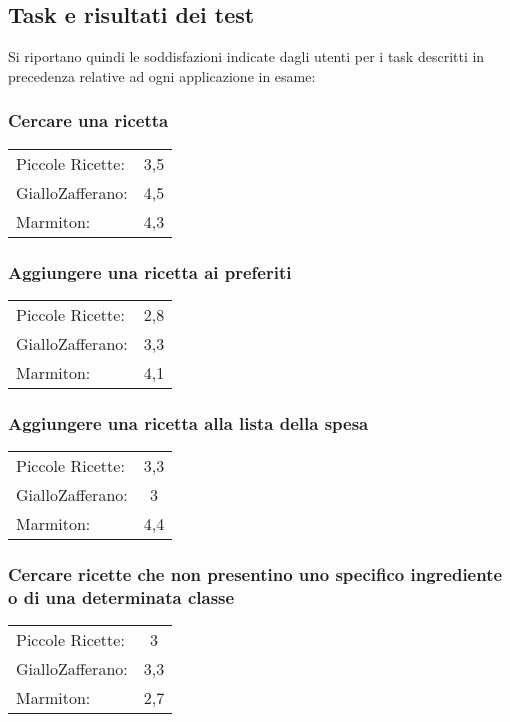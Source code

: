 \subsection{Task e risultati dei test}
Si riportano quindi le soddisfazioni indicate dagli utenti
per i task descritti in precedenza relative ad ogni applicazione in esame:

\subsubsection{Cercare una ricetta}
\begin{tabular}{l c}
Piccole Ricette: & 3,5\\
GialloZafferano: & 4,5\\
Marmiton: & 4,3\\
\end{tabular}

\subsubsection{Aggiungere una ricetta ai preferiti}
\begin{tabular}{l c}
Piccole Ricette: & 2,8\\
GialloZafferano: & 3,3\\
Marmiton: & 4,1\\
\end{tabular}

\subsubsection{Aggiungere una ricetta alla lista della spesa}
\begin{tabular}{l c}
Piccole Ricette: & 3,3\\
GialloZafferano: & 3\\
Marmiton: & 4,4\\
\end{tabular}

\subsubsection{Cercare ricette che non presentino uno specifico ingrediente o di
una determinata classe}
\begin{tabular}{l c}
Piccole Ricette: & 3\\
GialloZafferano: & 3,3\\
Marmiton: & 2,7\\
\end{tabular}

